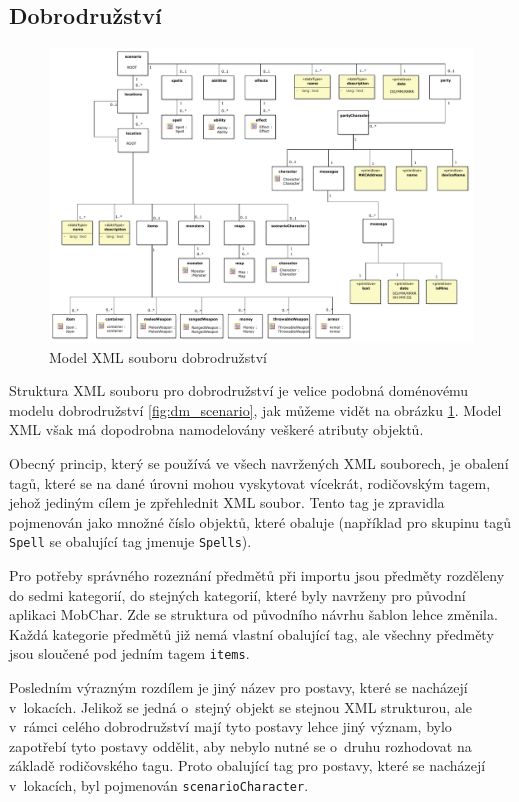 \documentclass[thesis=B,czech]{resources/FITthesis}[2012/06/26]
\begin{document}
\subsection{Dobrodružství}
\begin{figure}\centering
	\includegraphics[width=1\textwidth]{images/scenarioXML}
	\caption[Model XML souboru dobrodružství]{Model XML souboru dobrodružství}\label{fig:xml_scenario}
\end{figure}
Struktura XML souboru pro dobrodružství je velice podobná doménovému modelu dobrodružství \ref{fig:dm_scenario}, jak můžeme vidět na obrázku \ref{fig:xml_scenario}. Model XML však má dopodrobna namodelovány veškeré atributy objektů. \par

Obecný princip, který se používá ve všech navržených XML souborech, je obalení tagů, které se na dané úrovni mohou vyskytovat vícekrát, rodičovským tagem, jehož jediným cílem je zpřehlednit XML soubor. Tento tag je zpravidla pojmenován jako množné číslo objektů, které obaluje (například pro skupinu tagů \texttt{Spell} se obalující tag jmenuje \texttt{Spells}).

Pro potřeby správného rozeznání předmětů při importu jsou předměty rozděleny do sedmi kategorií, do stejných kategorií, které byly navrženy pro původní aplikaci MobChar. Zde se struktura od původního návrhu šablon lehce změnila. Každá kategorie předmětů již nemá vlastní obalující tag, ale všechny předměty jsou sloučené pod jedním tagem \texttt{items}. \par

Posledním výrazným rozdílem je jiný název pro postavy, které se nacházejí v~lokacích. Jelikož se jedná o~stejný objekt se stejnou XML strukturou, ale v~rámci celého dobrodružství mají tyto postavy lehce jiný význam, bylo zapotřebí tyto postavy oddělit, aby nebylo nutné se o~druhu rozhodovat na základě rodičovského tagu. Proto obalující tag pro postavy, které se nacházejí v~lokacích, byl pojmenován \texttt{scenarioCharacter}. 
\end{document}
